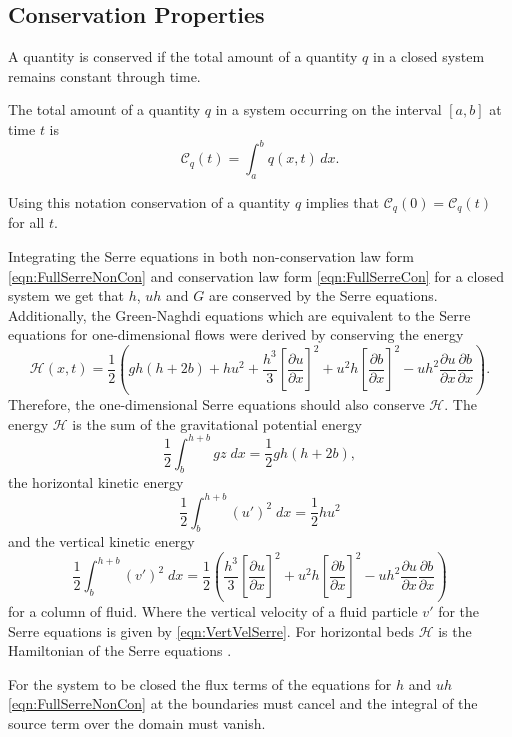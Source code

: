 \subsection{Conservation Properties}
A quantity is conserved if the total amount of a quantity $q$ in a closed system remains constant through time.
\begin{defn}
	\label{defn:TotalAmmountab}
	The total amount of a quantity $q$ in a system occurring on the interval $[a,b]$ at time $t$ is
	\begin{equation*}
	\mathcal{C}_q(t) = \int_{a}^{b} q(x,t)\, dx.
	\end{equation*}
\end{defn}
Using this notation conservation of a quantity $q$ implies that $\mathcal{C}_{q}(0) = \mathcal{C}_{q}(t)$ for all $t$. 

Integrating the Serre equations in both non-conservation law form \eqref{eqn:FullSerreNonCon} and conservation law form \eqref{eqn:FullSerreCon} for a closed system we get that $h$, $uh$ and $G$ are conserved by the Serre equations. Additionally, the Green-Naghdi equations \cite{Green-Naghdi-1976-237} which are equivalent to the Serre equations for one-dimensional flows were derived by conserving the energy
\begin{equation*}
	\mathcal{H}(x,t) = \frac{1}{2} \left( gh\left(h + 2b\right) + hu^2  + \frac{h^3}{3} \left[\frac{\partial u}{\partial x}\right]^2 + u^2h\left[\frac{\partial b}{\partial x}\right]^2 - uh^2 \frac{\partial u}{\partial x} \frac{\partial b}{\partial x}  \right).
	\label{eqn:Hamildef}
\end{equation*}
Therefore, the one-dimensional Serre equations should also conserve $\mathcal{H}$. The energy $\mathcal{H}$ is the sum of the gravitational potential energy
\[\frac{1}{2}\int_{b}^{h +b} gz \; dx = \frac{1}{2}gh\left(h + 2b\right),\]
the horizontal kinetic energy
\[\frac{1}{2}\int_{b}^{h +b} (u')^2 \; dx = \frac{1}{2}hu^2\]
and the vertical kinetic energy
\[\frac{1}{2}\int_{b}^{h +b} (v')^2 \; dx = \frac{1}{2} \left(\frac{h^3}{3} \left[\frac{\partial u}{\partial x}\right]^2 + u^2h\left[\frac{\partial b}{\partial x}\right]^2 - uh^2 \frac{\partial u}{\partial x} \frac{\partial b}{\partial x} \right)\]
for a column of fluid.
Where the vertical velocity of a fluid particle $v'$ for the Serre equations is given by \eqref{eqn:VertVelSerre}. For horizontal beds $\mathcal{H}$ is the Hamiltonian of the Serre equations \cite{Li-Y-2002}.
 
For the system to be closed the flux terms of the equations for $h$ and $uh$ \eqref{eqn:FullSerreNonCon} at the boundaries must cancel and the integral of the source term over the domain must vanish.

